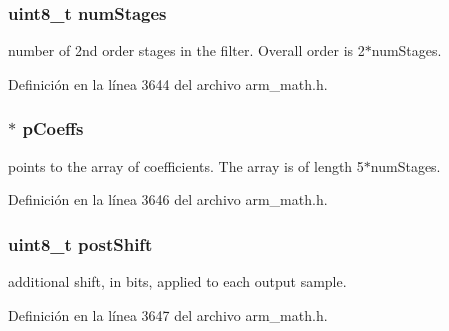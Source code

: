 \subsubsection[{\texorpdfstring{num\+Stages}{numStages}}]{\setlength{\rightskip}{0pt plus 5cm}uint8\+\_\+t num\+Stages}\hypertarget{structarm__biquad__cas__df1__32x64__ins__q31_a3615af038f56917909e0370c11bc2ec7}{}\label{structarm__biquad__cas__df1__32x64__ins__q31_a3615af038f56917909e0370c11bc2ec7}
number of 2nd order stages in the filter. Overall order is 2$\ast$num\+Stages. 

Definición en la línea 3644 del archivo arm\+\_\+math.\+h.

\subsubsection[{\texorpdfstring{p\+Coeffs}{pCoeffs}}]{$\ast$ p\+Coeffs}\hypertarget{structarm__biquad__cas__df1__32x64__ins__q31_a68888e36167d81cb7836db10367a1682}{}\label{structarm__biquad__cas__df1__32x64__ins__q31_a68888e36167d81cb7836db10367a1682}
points to the array of coefficients. The array is of length 5$\ast$num\+Stages. 

Definición en la línea 3646 del archivo arm\+\_\+math.\+h.

\subsubsection[{\texorpdfstring{post\+Shift}{postShift}}]{\setlength{\rightskip}{0pt plus 5cm}uint8\+\_\+t post\+Shift}\hypertarget{structarm__biquad__cas__df1__32x64__ins__q31_a74050e9f36542bd56f4052381a82ae8f}{}\label{structarm__biquad__cas__df1__32x64__ins__q31_a74050e9f36542bd56f4052381a82ae8f}
additional shift, in bits, applied to each output sample. 

Definición en la línea 3647 del archivo arm\+\_\+math.\+h.

